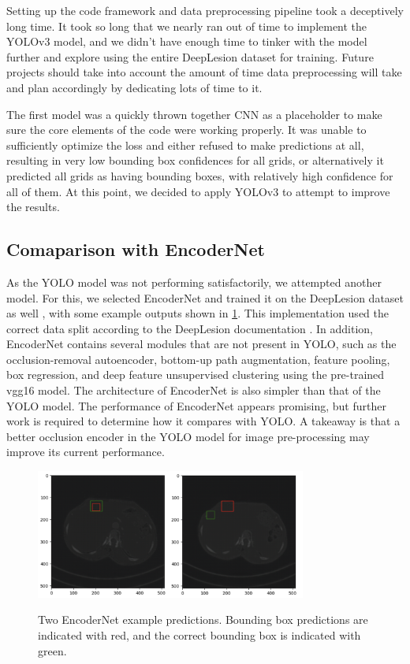 Setting up the code framework and data preprocessing pipeline took a deceptively long time. It took so long that we nearly ran out of time to implement the YOLOv3 model, and we didn't have enough time to tinker with the model further and explore using the entire DeepLesion dataset for training. Future projects should take into account the amount of time data preprocessing will take and plan accordingly by dedicating lots of time to it.

The first model was a quickly thrown together CNN as a placeholder to make sure the core elements of the code were working properly. It was unable to sufficiently optimize the loss and either refused to make predictions at all, resulting in very low bounding box confidences for all grids, or alternatively it predicted all grids as having bounding boxes, with relatively high confidence for all of them. At this point, we decided to apply YOLOv3 to attempt to improve the results.

\subsection{Comaparison with EncoderNet}
As the YOLO model was not performing satisfactorily, we attempted another model. For this, we selected EncoderNet and trained it on the DeepLesion dataset as well \cite{Tamhane_Saxena_Huang}, with some example outputs shown in \ref{fig:encoder}. This implementation used the correct data split according to the DeepLesion documentation \cite{deeplesion}. In addition, EncoderNet contains several modules that are not present in YOLO, such as the occlusion-removal autoencoder, bottom-up path augmentation, feature pooling, box regression, and deep feature unsupervised clustering using the pre-trained vgg16 model. The architecture of EncoderNet is also simpler than that of the YOLO model. The performance of EncoderNet appears promising, but further work is required to determine how it compares with YOLO. A takeaway is that a better occlusion encoder in the YOLO model for image pre-processing may improve its current performance.

\begin{figure}
 \begin{center}
 \includegraphics[width=3.5in]{images/encoder.png}\\
 \caption{Two EncoderNet example predictions. Bounding box predictions are indicated with red, and the correct bounding box is indicated with green.}\label{fig:encoder}
 \end{center}
\end{figure}

